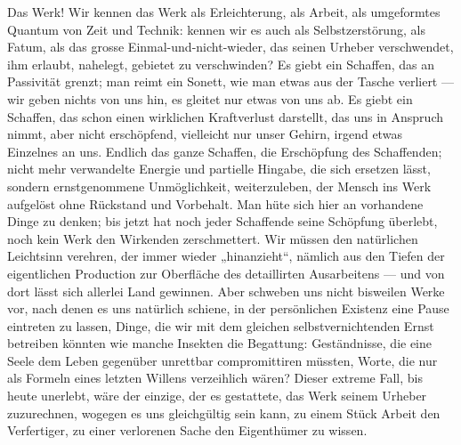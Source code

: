 Das Werk! Wir kennen das Werk als Erleichterung, als Arbeit, als umgeformtes Quantum von Zeit und Technik: kennen wir es auch als Selbstzerstörung, als Fatum, als das grosse Einmal-und-nicht-wieder, das seinen Urheber verschwendet, ihm erlaubt, nahelegt, gebietet zu verschwinden? Es giebt ein Schaffen, das an Passivität grenzt; man reimt ein Sonett, wie man etwas aus der Tasche verliert — wir geben nichts von uns hin, es gleitet nur etwas von uns ab. Es giebt ein Schaffen, das schon einen wirklichen Kraftverlust darstellt, das uns in Anspruch nimmt, aber nicht erschöpfend, vielleicht nur unser Gehirn, irgend etwas Einzelnes an uns. Endlich das ganze Schaffen, die Erschöpfung des Schaffenden; nicht mehr verwandelte Energie und partielle Hingabe, die sich ersetzen lässt, sondern ernstgenommene Unmöglichkeit, weiterzuleben, der Mensch ins Werk aufgelöst ohne Rückstand und Vorbehalt. Man hüte sich hier an vorhandene Dinge zu denken; bis jetzt hat noch jeder Schaffende seine Schöpfung überlebt, noch kein Werk den Wirkenden zerschmettert. Wir müssen den natürlichen Leichtsinn verehren, der immer wieder „hinanzieht“, nämlich aus den Tiefen der eigentlichen Production zur Oberfläche des detaillirten Ausarbeitens — und von dort lässt sich allerlei Land gewinnen. Aber schweben uns nicht bisweilen Werke vor, nach denen es uns natürlich schiene, in der persönlichen Existenz eine Pause eintreten zu lassen, Dinge, die wir mit dem gleichen selbstvernichtenden Ernst betreiben könnten wie manche Insekten die Begattung: Geständnisse, die eine Seele dem Leben gegenüber unrettbar compromittiren müssten, Worte, die nur als Formeln eines letzten Willens verzeihlich wären? Dieser extreme Fall, bis heute unerlebt, wäre der einzige, der es gestattete, das Werk seinem Urheber zuzurechnen, wogegen es uns gleichgültig sein kann, zu einem Stück Arbeit den Verfertiger, zu einer verlorenen Sache den Eigenthümer zu wissen.
\par

